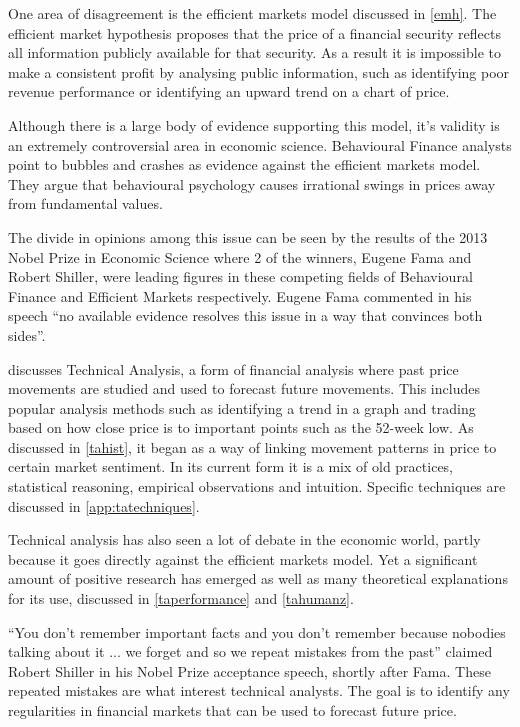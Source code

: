 \documentclass[12pt]{article}
\theoremstyle{definition}
\begin{document}
One area of disagreement is the efficient markets model discussed in \cref{emh}. The efficient market hypothesis proposes that the price of a financial security reflects all information publicly available for that security. As a result it is impossible to make a consistent profit by analysing public information, such as identifying poor revenue performance or identifying an upward trend on a chart of price.

Although there is a large body of evidence supporting this model, it's validity is an extremely controversial area in economic science. Behavioural Finance analysts point to bubbles and crashes as evidence against the efficient markets model. They argue that behavioural psychology causes irrational swings in prices away from fundamental values. 

The divide in opinions among this issue can be seen by the results of the 2013 Nobel Prize in Economic Science where 2 of the winners, Eugene Fama and Robert Shiller, were leading figures in these competing fields of Behavioural Finance and Efficient Markets respectively. Eugene Fama commented in his speech ``no available evidence resolves this issue in a way that convinces both sides''.

 discusses Technical Analysis, a form of financial analysis where past price movements are studied and used to forecast future movements. This includes popular analysis methods such as identifying a trend in a graph and trading based on how close price is to important points such as the 52-week low. As discussed in \cref{tahist}, it began as a way of linking movement patterns in price to certain market sentiment. In its current form it is a mix of old practices, statistical reasoning, empirical observations and intuition. Specific techniques are discussed in \cref{app:tatechniques}.

Technical analysis has also seen a lot of debate in the economic world, partly because it goes directly against the efficient markets model. Yet a significant amount of positive research has emerged as well as many theoretical explanations for its use, discussed in \cref{taperformance} and \cref{tahumanz}.

``You don't remember important facts and you don't remember because nobodies talking about it ... we forget and so we repeat mistakes from the past'' claimed Robert Shiller in his Nobel Prize acceptance speech, shortly after Fama. These repeated mistakes are what interest technical analysts. The goal is to identify any regularities in financial markets that can be used to forecast future price. 
\end{document}
